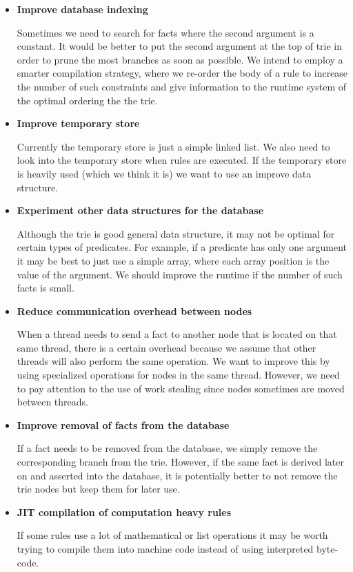\begin{itemize}
   \item \textbf{Improve database indexing}
   
   Sometimes we need to search for facts where the second argument is a constant. It would be better to put the second argument at the top of trie in order to prune the most branches as soon as possible. We intend to employ a smarter compilation strategy, where we re-order the body of a rule to increase the number of such constraints and give information to the runtime system of the optimal ordering the the trie.
   
   \item \textbf{Improve temporary store}
   
   Currently the temporary store is just a simple linked list. We also need to look into the temporary store when rules are executed. If the temporary store is heavily used (which we think it is) we want to use an improve data structure.
   
   \item \textbf{Experiment other data structures for the database}
   
   Although the trie is good general data structure, it may not be optimal for certain types of predicates. For example, if a predicate has only one argument it may be best to just use a simple array, where each array position is the value of the argument. We should improve the runtime if the number of such facts is small.
   
   \item \textbf{Reduce communication overhead between nodes}
   
   When a thread needs to send a fact to another node that is located on that same thread, there is a certain overhead because we assume that other threads will also perform the same operation. We want to improve this by using specialized operations for nodes in the same thread. However, we need to pay attention to the use of work stealing since nodes sometimes are moved between threads.
   
   \item \textbf{Improve removal of facts from the database}

   If a fact needs to be removed from the database, we simply remove the corresponding branch from the trie. However, if the same fact is derived later on and asserted into the database, it is potentially better to not remove the trie nodes but keep them for later use.
   
   \item \textbf{JIT compilation of computation heavy rules}
   
   If some rules use a lot of mathematical or list operations it may be worth trying to compile them into machine code instead of using interpreted byte-code.
\end{itemize}

